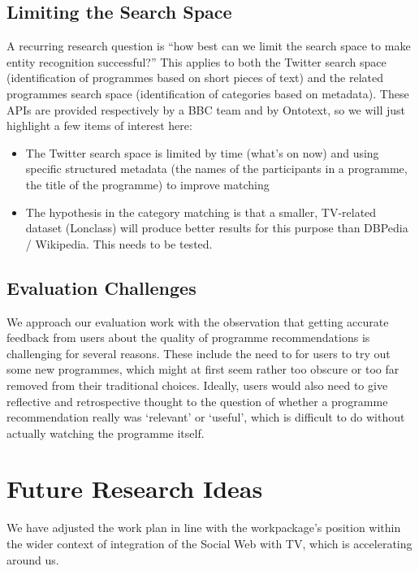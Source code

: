 \documentclass{notube}
\begin{document}
\section{Limiting the Search Space}

A recurring research question is ``how best can we limit the search space to make entity recognition successful?'' This applies to both the Twitter search space (identification of programmes based on short pieces of text) and the related programmes search space (identification of categories based on metadata). These APIs are provided respectively by a BBC team and by Ontotext, so we will just highlight a few items of interest here:

\begin{itemize}
\item{The Twitter search space is limited by time (what's on now) and using specific structured metadata (the names of the participants in a programme, the title of the programme) to improve matching}
\item{The hypothesis in the category matching is that a smaller, TV-related dataset (Lonclass) will produce better results for this purpose than DBPedia / Wikipedia. This needs to be tested.}
\end{itemize}

\section{Evaluation Challenges}

We approach our evaluation work with the observation that getting accurate feedback from users about the quality of programme recommendations is challenging for several reasons. These include the need to for users to try out some new programmes, which might at first seem rather too obscure or too far removed from their traditional choices. Ideally, users would also need to give reflective and retrospective thought to the question of whether a programme recommendation really was `relevant' or `useful', which is difficult to do without actually watching the programme itself.


\chapter{Future Research Ideas}

We have adjusted the work plan in line with the workpackage's position within the wider context of integration of the Social Web with TV, which is accelerating around us.
\end{document}
